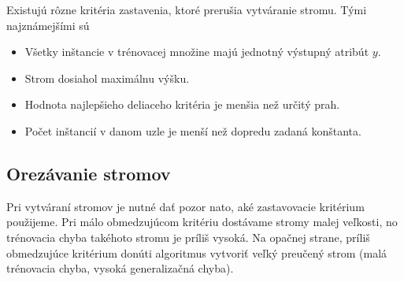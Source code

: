 %

Existujú rôzne kritéria zastavenia, ktoré prerušia vytváranie stromu. Tými najznámejšími sú

\begin{itemize}
\item Všetky inštancie v trénovacej množine majú jednotný výstupný atribút $y$.
\item Strom dosiahol maximálnu výšku.
\item Hodnota najlepšieho deliaceho kritéria je menšia než určitý prah.
\item Počet inštancií v danom uzle je menší než dopredu zadaná konštanta.
\end{itemize}

\subsection{Orezávanie stromov}\label{kap1:2.7:2.7.1:Pruning}
Pri vytváraní stromov je nutné dať pozor nato, aké zastavovacie kritérium použijeme. Pri málo obmedzujúcom kritériu dostávame stromy malej veľkosti, no trénovacia chyba takéhoto stromu je príliš vysoká. Na opačnej strane, príliš obmedzujúce kritérium donúti algoritmus vytvoriť veľký preučený strom (malá trénovacia chyba, vysoká generalizačná chyba).

